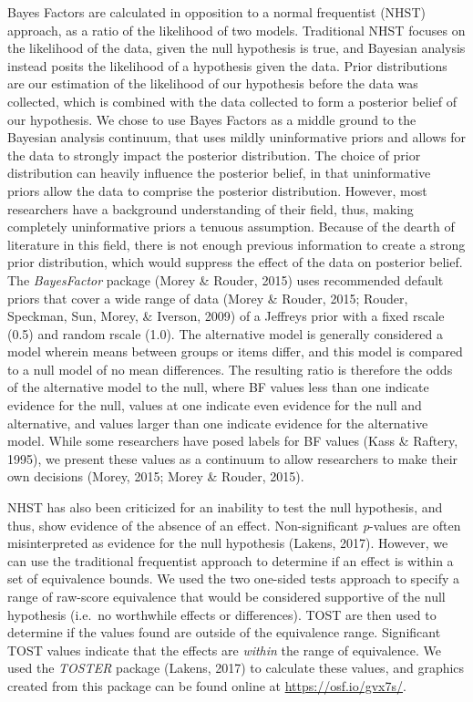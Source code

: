 \documentclass[english,man, mask]{apa6}
\theoremstyle{definition}
\theoremstyle{definition}
\theoremstyle{definition}
\theoremstyle{remark}
\begin{document}
Bayes Factors are calculated in opposition to a normal frequentist
(NHST) approach, as a ratio of the likelihood of two models. Traditional
NHST focuses on the likelihood of the data, given the null hypothesis is
true, and Bayesian analysis instead posits the likelihood of a
hypothesis given the data. Prior distributions are our estimation of the
likelihood of our hypothesis before the data was collected, which is
combined with the data collected to form a posterior belief of our
hypothesis. We chose to use Bayes Factors as a middle ground to the
Bayesian analysis continuum, that uses mildly uninformative priors and
allows for the data to strongly impact the posterior distribution. The
choice of prior distribution can heavily influence the posterior belief,
in that uninformative priors allow the data to comprise the posterior
distribution. However, most researchers have a background understanding
of their field, thus, making completely uninformative priors a tenuous
assumption. Because of the dearth of literature in this field, there is
not enough previous information to create a strong prior distribution,
which would suppress the effect of the data on posterior belief. The
\emph{BayesFactor} package (Morey \& Rouder, 2015) uses recommended
default priors that cover a wide range of data (Morey \& Rouder, 2015;
Rouder, Speckman, Sun, Morey, \& Iverson, 2009) of a Jeffreys prior with
a fixed rscale (0.5) and random rscale (1.0). The alternative model is
generally considered a model wherein means between groups or items
differ, and this model is compared to a null model of no mean
differences. The resulting ratio is therefore the odds of the
alternative model to the null, where BF values less than one indicate
evidence for the null, values at one indicate even evidence for the null
and alternative, and values larger than one indicate evidence for the
alternative model. While some researchers have posed labels for BF
values (Kass \& Raftery, 1995), we present these values as a continuum
to allow researchers to make their own decisions (Morey, 2015; Morey \&
Rouder, 2015).

NHST has also been criticized for an inability to test the null
hypothesis, and thus, show evidence of the absence of an effect.
Non-significant \emph{p}-values are often misinterpreted as evidence for
the null hypothesis (Lakens, 2017). However, we can use the traditional
frequentist approach to determine if an effect is within a set of
equivalence bounds. We used the two one-sided tests approach to specify
a range of raw-score equivalence that would be considered supportive of
the null hypothesis (i.e.~no worthwhile effects or differences). TOST
are then used to determine if the values found are outside of the
equivalence range. Significant TOST values indicate that the effects are
\emph{within} the range of equivalence. We used the \emph{TOSTER}
package (Lakens, 2017) to calculate these values, and graphics created
from this package can be found online at \url{https://osf.io/gvx7s/}.
\end{document}
